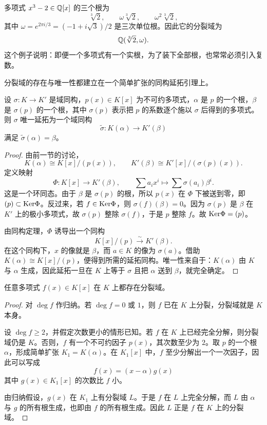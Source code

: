 \begin{example}
多项式 $x^3-2\in\mathbb{Q}[x]$ 的三个根为
\[
\sqrt[3]{2},\qquad \omega\sqrt[3]{2},\qquad \omega^2\sqrt[3]{2},
\]
其中 $\omega=e^{2\pi i/3}=(-1+i\sqrt3)/2$ 是三次单位根。因此它的分裂域为
\[
\mathbb{Q}(\sqrt[3]{2},\omega).
\]
这个例子说明：即便一个多项式有一个实根，为了装下全部根，也常常必须引入复数。
\end{example}

分裂域的存在与唯一性都建立在一个简单扩张的同构延拓引理上。

\begin{lemma}[简单扩张的同构延拓]
设 $\sigma:K\to K'$ 是域同构，$p(x)\in K[x]$ 为不可约多项式，$\alpha$ 是 $p$ 的一个根，$\beta$ 是 $\sigma(p)$ 的一个根，其中 $\sigma(p)$ 表示把 $p$ 的系数逐个施以 $\sigma$ 后得到的多项式。则 $\sigma$ 唯一延拓为一个域同构
\[
\widetilde\sigma:K(\alpha)\longrightarrow K'(\beta)
\]
满足 $\widetilde\sigma(\alpha)=\beta$。
\end{lemma}

\begin{proof}
由前一节的讨论，
\[
K(\alpha)\cong K[x]/(p(x)),\qquad K'(\beta)\cong K'[x]/(\sigma(p)(x)).
\]
定义映射
\[
\Phi:K[x]\longrightarrow K'(\beta),\qquad \sum a_i x^i\longmapsto \sum \sigma(a_i)\beta^i.
\]
这是一个环同态。由于 $\beta$ 是 $\sigma(p)$ 的根，所以 $p(x)$ 在 $\Phi$ 下被送到零，即 $(p)\subset\mathrm{Ker}\Phi$。反过来，若 $f\in\mathrm{Ker}\Phi$，则 $\sigma(f)(\beta)=0$。因为 $\sigma(p)$ 是 $\beta$ 在 $K'$ 上的极小多项式，故 $\sigma(p)$ 整除 $\sigma(f)$，于是 $p$ 整除 $f$。故 $\mathrm{Ker}\Phi=(p)$。

由同构定理，$\Phi$ 诱导出一个同构
\[
K[x]/(p)\xrightarrow{\sim} K'(\beta).
\]
在这个同构下，$x$ 的像就是 $\beta$，而 $a\in K$ 的像为 $\sigma(a)$。借助 $K(\alpha)\cong K[x]/(p)$，便得到所需的延拓同构。唯一性来自于：$K(\alpha)$ 由 $K$ 与 $\alpha$ 生成，因此延拓一旦在 $K$ 上等于 $\sigma$ 且把 $\alpha$ 送到 $\beta$，就完全确定。
\end{proof}

\begin{theorem}[分裂域的存在]
任意多项式 $f(x)\in K[x]$ 在 $K$ 上都存在分裂域。
\end{theorem}

\begin{proof}
对 $\deg f$ 作归纳。若 $\deg f=0$ 或 $1$，则 $f$ 已在 $K$ 上分裂，分裂域就是 $K$ 本身。

设 $\deg f\ge2$，并假定次数更小的情形已知。若 $f$ 在 $K$ 上已经完全分解，则分裂域仍是 $K$。否则，$f$ 有一个不可约因子 $p(x)$，其次数至少为 $2$。取 $p$ 的一个根 $\alpha$，形成简单扩张 $K_1=K(\alpha)$。在 $K_1[x]$ 中，$f$ 至少分解出一个一次因子，因此可以写成
\[
f(x)=(x-\alpha)g(x)
\]
其中 $g(x)\in K_1[x]$ 的次数比 $f$ 小。

由归纳假设，$g(x)$ 在 $K_1$ 上有分裂域 $L$。于是 $f$ 在 $L$ 上完全分解，而 $L$ 由 $\alpha$ 与 $g$ 的所有根生成，也即由 $f$ 的所有根生成。因此 $L$ 正是 $f$ 在 $K$ 上的分裂域。
\end{proof}

